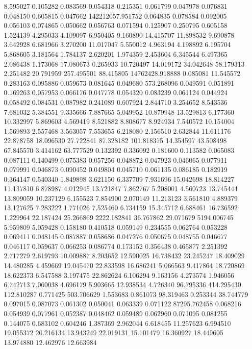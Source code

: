 8.595027
0.105282
0.083569
0.054318
0.215351
0.061799
0.047978
0.076831
0.048150
0.605815
0.047662
142212057.951752
0.064835
0.078584
0.092005
0.056103
0.074865
0.050662
0.056763
0.071594
0.125907
0.250795
0.605158
1.524139
4.295033
4.109097
6.950405
9.160890
14.415707
11.898532
9.690878
3.642928
6.681966
3.270200
11.017047
5.550012
4.963194
4.198892
6.195704
5.868605
3.181564
1.784137
2.620201
1.974359
2.453604
6.345544
6.497365
2.086438
1.173068
17.080673
0.265933
10.720497
14.019172
34.042648
58.179313
2.251482
20.791959
257.495501
88.415805
14762428.918888
0.085081
11.545572
0.283163
0.095886
0.059673
0.081645
0.049680
573.268096
0.049591
0.051891
0.169263
0.057953
0.066176
0.047778
0.054320
0.083239
0.061124
0.044924
0.058492
0.084531
0.087982
0.241089
0.607924
2.844710
3.254652
8.543536
7.681032
5.384551
9.335666
7.887665
5.049952
10.879948
13.529813
6.177360
10.332997
5.869603
4.569419
8.521882
8.808677
8.924934
7.540572
10.154004
1.569893
2.557468
3.563057
7.553655
6.218080
2.156510
2.632844
11.611176
22.878758
18.096530
27.722841
87.328182
101.818375
14.354597
43.508498
67.845570
3.414162
63.777529
0.132392
0.336092
0.181600
0.113582
0.065083
0.087111
0.140499
0.075383
0.057256
0.048872
0.047923
0.046065
0.077911
0.079991
0.046873
0.090452
0.049804
0.045710
0.061135
0.086185
0.182919
0.364147
0.540340
1.849898
3.621150
6.337709
7.931696
15.042698
18.814227
11.137810
6.878987
4.012945
13.721847
7.862767
5.208001
4.560723
13.745444
13.809059
10.237129
6.155523
7.854900
2.070149
11.213123
3.561810
4.889379
13.127625
7.283222
1.771026
7.525460
6.734159
15.345712
6.688461
16.736592
1.229964
22.187424
25.266869
2222.182841
36.767862
29.071679
5194.006745
5.959809
5.059428
0.158180
0.410518
0.059149
0.234555
0.062764
0.053228
0.069411
0.048145
0.087887
0.058686
0.047276
0.050675
0.048755
0.046677
0.046117
0.059637
0.066253
0.086774
0.173152
0.356438
0.465877
2.251392
2.717279
2.619793
10.009887
8.203652
12.590025
16.738432
23.245247
18.409029
14.480285
4.459669
19.045470
22.833598
16.686241
5.066563
9.417864
18.720869
18.622373
6.547588
3.197475
22.862624
6.106294
9.163156
4.273574
1.946056
6.742713
7.060038
4.696179
5.903665
12.938534
4.726340
96.795336
414.295430
112.810287
0.771425
503.706629
1.553683
0.861073
98.319463
0.253344
38.744779
0.097015
0.087073
0.061302
0.050041
0.063339
0.071122
87295.762458
0.068216
0.054939
0.077961
0.052387
0.048462
0.059489
0.062960
0.071095
0.081255
0.144075
0.683102
0.604246
1.387369
2.962044
6.618455
11.257623
6.994510
19.055372
20.216134
13.943249
22.019131
15.101479
16.360927
18.449605
13.974880
12.462976
12.663984
